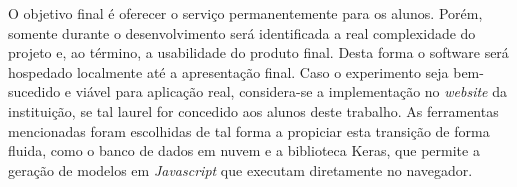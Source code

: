\documentclass[
	12pt,				%
	oneside,
	a4paper,			%
	english,			%
	french,				%
	spanish,			%
	brazil				%
	]{abntex2}
\begin{document}
O objetivo final é oferecer o serviço permanentemente para os alunos. Porém, somente durante o desenvolvimento será identificada a real complexidade do projeto e, ao término, a usabilidade do produto final. Desta forma o software será hospedado localmente até a apresentação final. Caso o experimento seja bem-sucedido e viável para aplicação real, considera-se a implementação no \emph{website} da instituição, se tal laurel for concedido aos alunos deste trabalho. As ferramentas mencionadas foram escolhidas de tal forma a propiciar esta transição de forma fluida, como o banco de dados em nuvem e a biblioteca Keras, que permite a geração de modelos em \emph{Javascript} que executam diretamente no navegador.






\postextual

%
\end{document}
